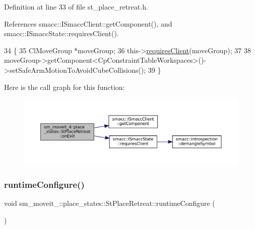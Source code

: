 Definition at line 33 of file st\+\_\+place\+\_\+retreat.\+h.



References smacc\+::\+I\+Smacc\+Client\+::get\+Component(), and smacc\+::\+I\+Smacc\+State\+::requires\+Client().


\begin{DoxyCode}
34     \{
35         ClMoveGroup *moveGroup;
36         this->\hyperlink{classsmacc_1_1ISmaccState_a7f95c9f0a6ea2d6f18d1aec0519de4ac}{requiresClient}(moveGroup);
37 
38         moveGroup->getComponent<CpConstraintTableWorkspaces>()->setSafeArmMotionToAvoidCubeCollisions();
39     \}
\end{DoxyCode}
Here is the call graph for this function\+:
\nopagebreak
\begin{figure}[H]
\begin{center}
\leavevmode
\includegraphics[width=350pt]{structsm__moveit__4_1_1place__states_1_1StPlaceRetreat_a700f6a70e4c9836fef4b4b3e9546500d_cgraph}
\end{center}
\end{figure}
\mbox{\label{structsm__moveit__4_1_1place__states_1_1StPlaceRetreat_a592a95bb086fd10381dee175af55e71e}} 
\subsubsection{\texorpdfstring{runtime\+Configure()}{runtimeConfigure()}}
{\footnotesize\ttfamily void sm\+\_\+moveit\+\_\+::place\+\_\+states\+::\+St\+Place\+Retreat\+::runtime\+Configure (\begin{DoxyParamCaption}{ }\end{DoxyParamCaption})\hspace{0.3cm}{\ttfamily [inline]}}



